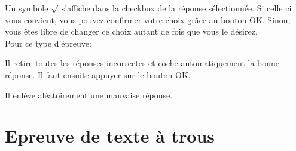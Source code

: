 \documentclass[11pt]{scrreprt}
\begin{document}
    Un symbole $\surd$ s'affiche dans la checkbox de la réponse sélectionnée. Si celle ci vous convient, vous pouvez confirmer votre choix grâce au bouton OK. Sinon, vous êtes libre de changer ce choix autant de fois que vous le désirez.\\

    Pour ce type d'épreuve:
    \begin{description}[style=nextline]
        \item[Bouton de triche]Il retire toutes les réponses incorrectes et coche automatiquement la bonne réponse. Il faut ensuite appuyer sur le bouton OK.
        \item[Bouton d'aide]Il enlève aléatoirement une mauvaise réponse.
    \end{description}

    \section{Epreuve de texte à trous}
\end{document}
